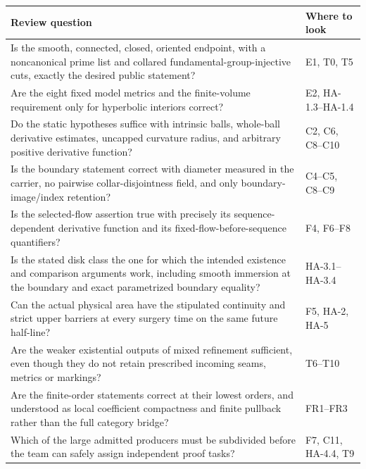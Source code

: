 \documentclass[
  letterpaper,
  11pt]{article}
\begin{document}
\begin{longtable}[]{@{}
  >{\raggedright\arraybackslash}p{}
  >{\raggedright\arraybackslash}p{}@{}}
\toprule\noalign{}
\begin{minipage}[b]{\linewidth}\raggedright
Review question
\end{minipage} & \begin{minipage}[b]{\linewidth}\raggedright
Where to look
\end{minipage} \\
\midrule\noalign{}
\endhead
\bottomrule\noalign{}
\endlastfoot
Is the smooth, connected, closed, oriented endpoint, with a noncanonical
prime list and collared fundamental-group-injective cuts, exactly the
desired public statement? & E1, T0, T5 \\
Are the eight fixed model metrics and the finite-volume requirement only
for hyperbolic interiors correct? & E2, HA-1.3--HA-1.4 \\
Do the static hypotheses suffice with intrinsic balls, whole-ball
derivative estimates, uncapped curvature radius, and arbitrary positive
derivative function? & C2, C6, C8--C10 \\
Is the boundary statement correct with diameter measured in the carrier,
no pairwise collar-disjointness field, and only boundary-image/index
retention? & C4--C5, C8--C9 \\
Is the selected-flow assertion true with precisely its
sequence-dependent derivative function and its
fixed-flow-before-sequence quantifiers? & F4, F6--F8 \\
Is the stated disk class the one for which the intended existence and
comparison arguments work, including smooth immersion at the boundary
and exact parametrized boundary equality? & HA-3.1--HA-3.4 \\
Can the actual physical area have the stipulated continuity and strict
upper barriers at every surgery time on the same future half-line? & F5,
HA-2, HA-5 \\
Are the weaker existential outputs of mixed refinement sufficient, even
though they do not retain prescribed incoming seams, metrics or
markings? & T6--T10 \\
Are the finite-order statements correct at their lowest orders, and
understood as local coefficient compactness and finite pullback rather
than the full category bridge? & FR1--FR3 \\
Which of the large admitted producers must be subdivided before the team
can safely assign independent proof tasks? & F7, C11, HA-4.4, T9 \\
\end{longtable}
\end{document}
